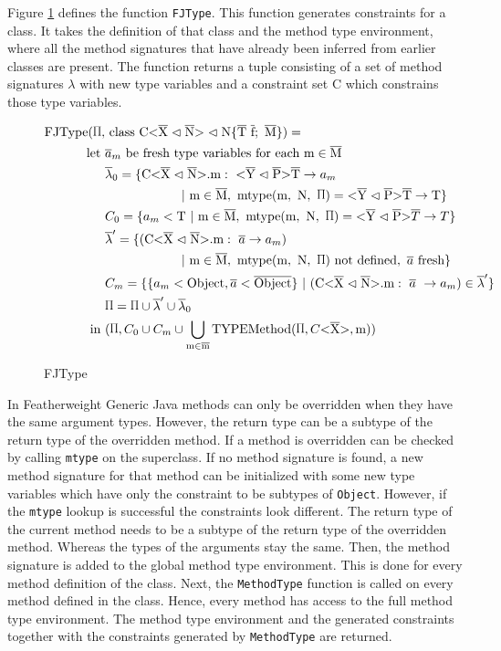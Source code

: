 Figure \ref{fjtype} defines the function \verb|FJType|. This function generates constraints for a class. It takes the definition of that class and the method type environment, where all the method signatures that have already been inferred from earlier classes are present.
The function returns a tuple consisting of a set of method signatures $\lambda$ with new type variables and a constraint set C which constrains those type variables.

\begin{figure}[tp]
    \begin{align*}
        \text{FJType}(\sprod{0.7}, & \ \classheader \{ \ot{T} \ \ot{f}; \ \ot{M} \}) = \\
        \text{let} \ & \overline{a}_m \ \text{be fresh type variables for each m} \in \ot{M} \\
        & \overline{\lambda}_0 = \{\cm : \ \yp \ot{T} \to a_m \\
        & \quad \quad \quad \quad \quad \quad | \ \text{m} \in \ot{M}, \ \mtype = \yp \ot{T} \to \text{T} \}\\
        & C_0 = \{ a_m < \text{T} \ | \ \text{m} \in \ot{M}, \ \mtype = \yp \oto{T} \}\\
        & \overline{\lambda}' = \{ ( \cm : \ \overline{a} \to a_m ) \\
        & \quad \quad \quad \quad \quad \quad | \ \text{m} \in \ot{M}, \ \mtype \ \text{not defined}, \ \fresh{\overline{a}} \}\\
        & C_m = \{\{ a_m < \text{Object}, \overline{a} < \ot{Object} \} \ | \ ( \cm : \ \overline{a} \ \to a_m) \in \overline{\lambda}' \} \\
        & \sprod{0.7} = \sprod{0.7} \cup \overline{\lambda}' \cup \overline{\lambda}_0\\
    \text{in} \ &(\sprod{0.7}, C_0 \cup C_m \cup \bigcup_{ \text{m} \in \ot{m} } \text{TYPEMethod}(\sprod{0.7}, C \vv{\ot{X}}, \text{m}))\\
    \end{align*}
    \caption{FJType}
    \label{fjtype}
\end{figure}

In Featherweight Generic Java methods can only be overridden when they have the same argument types. However, the return type can be a subtype of the return type of the overridden method. If a method is overridden can be checked by calling \verb|mtype| on the superclass.
If no method signature is found, a new method signature for that method can be initialized with some new type variables which have only the constraint to be subtypes of \verb|Object|.
However, if the \verb|mtype| lookup is successful the constraints look different. The return type of the current method needs to be a subtype of the return type of the overridden method.
Whereas the types of the arguments stay the same. Then, the method signature is added to the global method type environment.
This is done for every method definition of the class. Next, the \verb|MethodType| function is called on every method defined in the class. Hence, every method has access to the full method type environment.
The method type environment and the generated constraints together with the constraints generated by \verb|MethodType| are returned.

